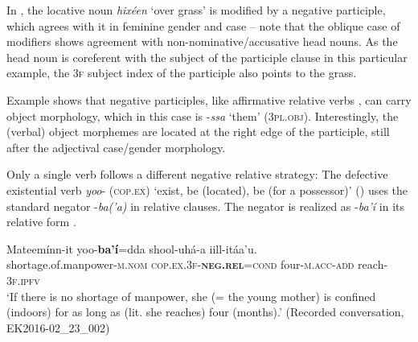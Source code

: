 \documentclass[output=paper,colorlinks,citecolor=brown,draftmode
]{langscibook}
\begin{document}
In , the locative noun \textit{hixéen} ‘over grass’ is modified by a negative participle, which agrees with it in feminine gender and case – note that the oblique case of modifiers shows agreement with non-nominative/accusative head nouns. As the head noun is coreferent with the subject of the participle clause in this particular example, the \textsc{3f} subject index of the participle also points to the grass.



Example  shows that negative participles, like affirmative relative verbs , can carry object morphology, which in this case is -\textit{ssa} ‘them’ (\textsc{3pl.obj}). Interestingly, the (verbal) object morphemes are located at the right edge of the participle, still after the adjectival case/gender morphology.

\largerpage
Only a single verb follows a different negative relative strategy: The defective existential verb \textit{yoo}- (\textsc{cop.ex}) ‘exist, be (located), be (for a possessor)’ () uses the standard negator -\textit{ba(’a)} in relative clauses. The negator is realized as -\textit{ba’í} in its relative form .

\ea\label{ex:treis:24} 
\gll Mateemínn-it yoo-\textbf{ba’í}=dda shool-uhá-a iill-itáa’u.\\
shortage.of.manpower-\textsc{m.nom}	\textsc{cop.ex.3f-\textbf{neg.rel}=cond} four-\textsc{m.acc-add} reach-\textsc{3f.ipfv}\\
\glt ‘If there is no shortage of manpower, she (= the young mother) is confined (indoors) for as long as (lit. she reaches) four (months).’  (Recorded conversation, EK2016-02\_23\_002)
\z 
\end{document}
